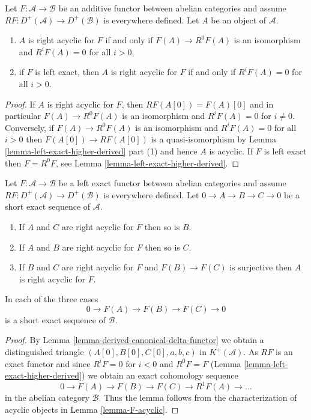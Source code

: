 \begin{lemma}
\label{lemma-F-acyclic}
Let $F : \mathcal{A} \to \mathcal{B}$ be an additive functor
between abelian categories and assume
$RF : D^{+}(\mathcal{A}) \to D^{+}(\mathcal{B})$ is everywhere
defined. Let $A$ be an object of $\mathcal{A}$.
\begin{enumerate}
\item $A$ is right acyclic for $F$ if and only if
$F(A) \to R^0F(A)$ is an isomorphism and $R^iF(A) = 0$ for all $i > 0$,
\item if $F$ is left exact, then $A$ is right acyclic for $F$
if and only if $R^iF(A) = 0$ for all $i > 0$.
\end{enumerate}
\end{lemma}

\begin{proof}
If $A$ is right acyclic for $F$, then $RF(A[0]) = F(A)[0]$ and in
particular $F(A) \to R^0F(A)$ is an isomorphism and
$R^iF(A) = 0$ for $i \not = 0$. Conversely, if $F(A) \to R^0F(A)$
is an isomorphism and $R^iF(A) = 0$ for all $i > 0$ then
$F(A[0]) \to RF(A[0])$ is a quasi-isomorphism by
Lemma \ref{lemma-left-exact-higher-derived} part (1)
and hence $A$ is acyclic. If $F$ is left exact then $F = R^0F$, see
Lemma \ref{lemma-left-exact-higher-derived}.
\end{proof}

\begin{lemma}
\label{lemma-F-acyclic-ses}
Let $F : \mathcal{A} \to \mathcal{B}$ be a left exact functor
between abelian categories and assume
$RF : D^{+}(\mathcal{A}) \to D^{+}(\mathcal{B})$ is everywhere
defined. Let $0 \to A \to B \to C \to 0$ be a short exact sequence
of $\mathcal{A}$.
\begin{enumerate}
\item If $A$ and $C$ are right acyclic for $F$ then so is $B$.
\item If $A$ and $B$ are right acyclic for $F$ then so is $C$.
\item If $B$ and $C$ are right acyclic for $F$ and $F(B) \to F(C)$ is
surjective then $A$ is right acyclic for $F$.
\end{enumerate}
In each of the three cases
$$
0 \to F(A) \to F(B) \to F(C) \to 0
$$
is a short exact sequence of $\mathcal{B}$.
\end{lemma}

\begin{proof}
By
Lemma \ref{lemma-derived-canonical-delta-functor}
we obtain a distinguished triangle
$(A[0], B[0], C[0], a, b, c)$ in $K^{+}(\mathcal{A})$.
As $RF$ is an exact functor and since
$R^iF = 0$ for $i < 0$ and $R^0F = F$
(Lemma \ref{lemma-left-exact-higher-derived})
we obtain an exact cohomology sequence
$$
0 \to F(A) \to F(B) \to F(C) \to R^1F(A) \to \ldots
$$
in the abelian category $\mathcal{B}$. Thus the lemma follows from
the characterization of acyclic objects in
Lemma \ref{lemma-F-acyclic}.
\end{proof}


